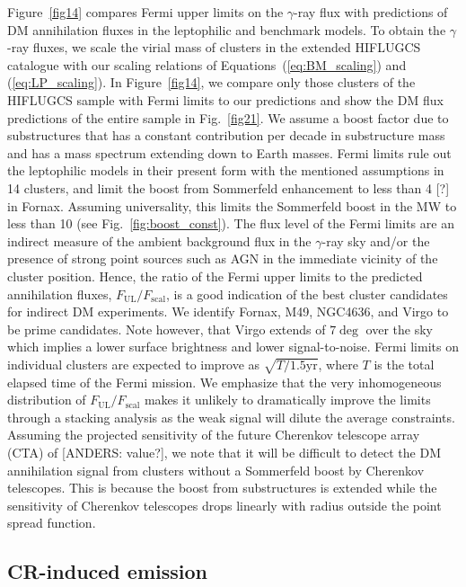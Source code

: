 \documentclass[10pt,aps,pra,reprint,amsmath,amsfonts,amssymb,showpacs]{revtex4-1}
\begin{document}
Figure~\ref{fig14} compares Fermi upper limits on the $\gamma$-ray flux with
predictions of DM annihilation fluxes in the leptophilic and benchmark models.
To obtain the $\gamma$-ray fluxes, we scale the virial mass of clusters in the
extended HIFLUGCS catalogue \cite{2002ApJ...567..716R} with our scaling
relations of Equations~(\ref{eq:BM_scaling}) and (\ref{eq:LP_scaling}). In
Figure~\ref{fig14}, we compare only those clusters of the HIFLUGCS sample with
Fermi limits to our predictions and show the DM flux predictions of the entire
sample in Fig.~\ref{fig21}.  We assume a boost factor due to substructures that
has a constant contribution per decade in substructure mass and has a mass
spectrum extending down to Earth masses. Fermi limits rule out the leptophilic
models in their present form with the mentioned assumptions in 14 clusters, and
limit the boost from Sommerfeld enhancement to less than 4 [?] in
Fornax. Assuming universality, this limits the Sommerfeld boost in the MW to
less than 10 (see Fig.~\ref{fig:boost_const}).  The flux level of the Fermi
limits are an indirect measure of the ambient background flux in the
$\gamma$-ray sky and/or the presence of strong point sources such as AGN in the
immediate vicinity of the cluster position. Hence, the ratio of the Fermi upper
limits to the predicted annihilation fluxes,
$F_{\mathrm{UL}}/F_{\mathrm{scal}}$, is a good indication of the best cluster
candidates for indirect DM experiments. We identify Fornax, M49, NGC4636, and
Virgo to be prime candidates. Note however, that Virgo extends of $7\deg$ over
the sky which implies a lower surface brightness and lower signal-to-noise.
Fermi limits on individual clusters are expected to improve as $\sqrt{T/1.5
  \mathrm{yr}}$, where $T$ is the total elapsed time of the Fermi mission. We
emphasize that the very inhomogeneous distribution of $F_{\mathrm{UL}}/
F_{\mathrm{scal}}$ makes it unlikely to dramatically improve the limits through
a stacking analysis as the weak signal will dilute the average constraints.
Assuming the projected sensitivity of the future Cherenkov telescope array (CTA)
of [ANDERS: value?], we note that it will be difficult to detect the DM
annihilation signal from clusters without a Sommerfeld boost by Cherenkov
telescopes. This is because the boost from substructures is extended while the
sensitivity of Cherenkov telescopes drops linearly with radius outside the point
spread function.

\subsection{CR-induced emission}
\end{document}
